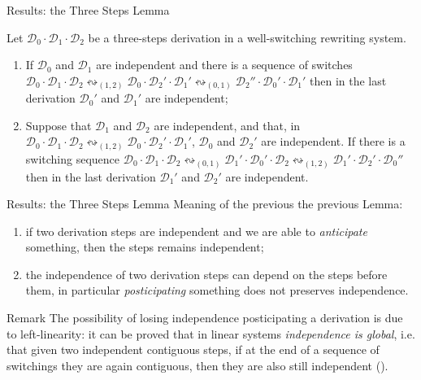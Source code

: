 \documentclass[usenames,dvipsnames]{beamer}
\newcommand{\shift}[1]{\ensuremath{\mathrel{{\leftrightsquigarrow}_{#1}}}}
\newcommand{\dder}[1]{\mathscr{#1}}
\begin{document}
\begin{frame}{Results: the Three Steps Lemma}\justifying
	
	\begin{lemma}  Let
		$\dder{D}_0\cdot \dder{D}_1 \cdot \dder{D}_2$ be a three-steps
		derivation in a well-switching rewriting system. \pause 
		\begin{enumerate}\justifying
			\item
			If $\dder{D}_0$ and $\dder{D}_1$ are independent and there is a
			sequence of switches
			$\dder{D}_0\cdot \dder{D}_1 \cdot \dder{D}_2 \shift{(1,2)}
			\dder{D}_0 \cdot \dder{D}_2' \cdot \dder{D}_1' \shift{(0,1)}
			\dder{D}_2'' \cdot \dder{D}_0' \cdot \dder{D}_1'$ then
			in the last derivation $\dder{D}_0'$ and $\dder{D}_1'$ are independent; \pause 
			
			\item 
			Suppose that $\dder{D}_1$ and $\dder{D}_2$ are independent, and that, in $\dder{D}_0\cdot \dder{D}_1 \cdot \dder{D}_2 \shift{(1,2)}
			\dder{D}_0 \cdot \dder{D}_2' \cdot \dder{D}_1'$, $\dder{D}_0$ and $\dder{D}_2'$ are independent.  If there
			is a switching sequence
			$\dder{D}_0\cdot \dder{D}_1 \cdot \dder{D}_2 \shift{(0,1)}
			\dder{D}_1' \cdot \dder{D}_0' \cdot \dder{D}_2 \shift{(1,2)}
			\dder{D}_1' \cdot \dder{D}_2' \cdot \dder{D}_0''$ then in the last derivation $\dder{D}_1'$ and $\dder{D}_2'$ are independent.
		\end{enumerate}
	\end{lemma}
\end{frame}

\begin{frame}{Results: the Three Steps Lemma}\justifying
Meaning of the previous the previous Lemma: \pause 
\begin{enumerate}
	\item if two derivation steps are independent and we are able to \emph{anticipate} something, then the steps remains independent; \pause 
	\item the independence of two derivation steps can depend on the steps before them, in particular \emph{posticipating} something does not preserves independence.
\end{enumerate}
\pause 

\begin{block}{Remark}
The possibility of losing independence posticipating a derivation is due to left-linearity: it can be proved that in linear systems \emph{independence is global}, i.e. that given two independent contiguous steps, if  at the end of a sequence of switchings they are again contiguous, then they are also still independent (\cite{heindel2009category}).
\end{block}




\end{frame}
\end{document}
